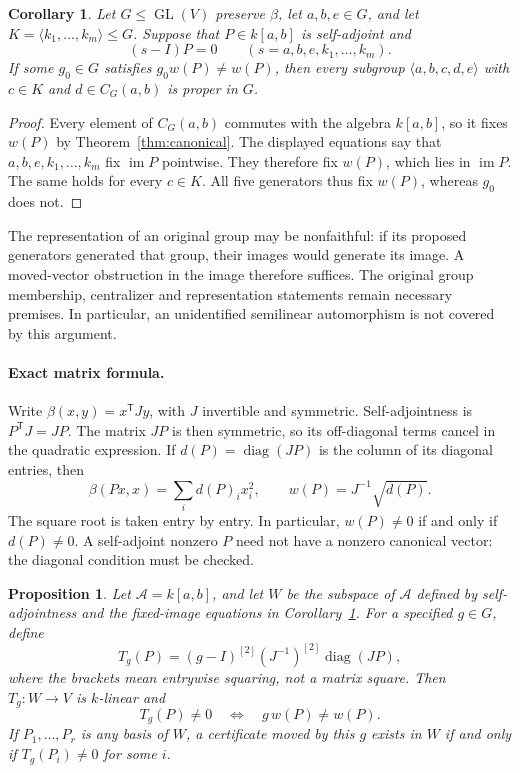 \documentclass[11pt]{article}
\newtheorem{corollary}[theorem]{Corollary}
\newtheorem{proposition}[theorem]{Proposition}
\newcommand{\im}{\operatorname{im}}
\begin{document}
\begin{corollary}\label{cor:proper}
Let $G\leq\operatorname{GL}(V)$ preserve $\beta$, let $a,b,e\in G$, and
let $K=\langle k_1,\ldots,k_m\rangle\leq G$.  Suppose that
$P\in k[a,b]$ is self-adjoint and
\[
  (s-I)P=0\qquad(s=a,b,e,k_1,\ldots,k_m).
\]
If some $g_0\in G$ satisfies $g_0w(P)\ne w(P)$, then every subgroup
$\langle a,b,c,d,e\rangle$ with $c\in K$ and $d\in C_G(a,b)$ is proper
in $G$.
\end{corollary}

\begin{proof}
Every element of $C_G(a,b)$ commutes with the algebra $k[a,b]$, so it
fixes $w(P)$ by Theorem~\ref{thm:canonical}.  The displayed equations
say that $a,b,e,k_1,\ldots,k_m$ fix $\im P$ pointwise.  They therefore
fix $w(P)$, which lies in $\im P$.  The same holds for every $c\in K$.
All five generators thus fix $w(P)$, whereas $g_0$ does not.
\end{proof}

The representation of an original group may be nonfaithful: if its
proposed generators generated that group, their images would generate
its image.  A moved-vector obstruction in the image therefore suffices.
The original group membership, centralizer and representation statements
remain necessary premises.  In particular, an unidentified semilinear
automorphism is not covered by this argument.

\paragraph{Exact matrix formula.}
Write $\beta(x,y)=x^{\mathsf T}Jy$, with $J$ invertible and symmetric.
Self-adjointness is $P^{\mathsf T}J=JP$.  The matrix $JP$ is then
symmetric, so its off-diagonal terms cancel in the quadratic expression.
If $d(P)=\operatorname{diag}(JP)$ is the column of its diagonal entries,
then
\[
 \beta(Px,x)=\sum_i d(P)_i x_i^2,\qquad
                  w(P)=J^{-1}\sqrt{d(P)}.
\]
The square root is taken entry by entry.  In particular, $w(P)\ne0$ if
and only if $d(P)\ne0$.  A self-adjoint nonzero $P$ need not have a
nonzero canonical vector: the diagonal condition must be checked.

\begin{proposition}\label{prop:linear}
Let $\mathcal A=k[a,b]$, and let $W$ be the subspace of $\mathcal A$
defined by self-adjointness and the fixed-image equations in
Corollary~\ref{cor:proper}.  For a specified $g\in G$, define
\[
 T_g(P)=(g-I)^{[2]}(J^{-1})^{[2]}\operatorname{diag}(JP),
\]
where the brackets mean entrywise squaring, not a matrix square.  Then
$T_g:W\longrightarrow V$ is $k$-linear and
\[
                 T_g(P)\ne0\quad\Longleftrightarrow\quad
                 g\,w(P)\ne w(P).
\]
If $P_1,\ldots,P_r$ is any basis of $W$, a certificate moved by this $g$
exists in $W$ if and only if $T_g(P_i)\ne0$ for some $i$.
\end{proposition}
\end{document}
